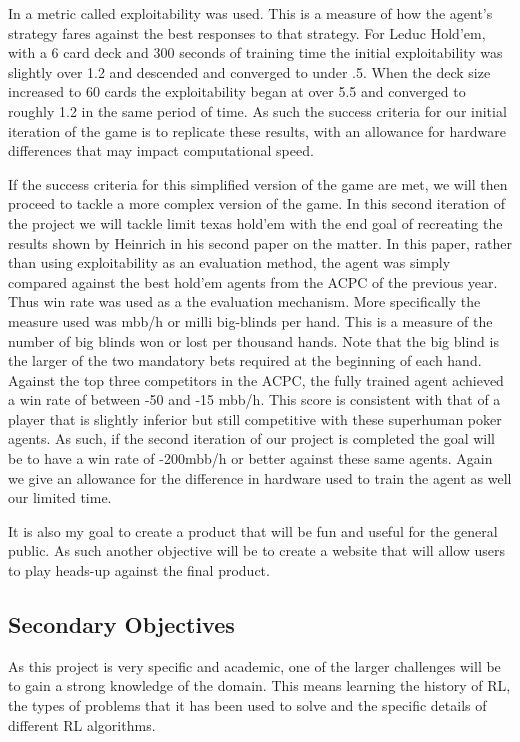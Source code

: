 In\citep{heinrich2015fictitious} a metric called exploitability was used.
This is a measure of how the agent's strategy fares against the best responses to that strategy.
For Leduc Hold'em, with a 6 card deck and 300 seconds of training time the initial exploitability was slightly
over 1.2 and descended and converged to under .5.
When the deck size increased to 60 cards the exploitability began at over 5.5 and converged to roughly 1.2 in
the same period of time.
As such the success criteria for our initial iteration of the game is to replicate these results, with an
allowance for hardware differences that may impact computational speed.

If the success criteria for this simplified version of the game are met, we will then proceed to tackle
a more complex version of the game.
In this second iteration of the project we will tackle limit texas hold'em with the end goal of recreating
the results shown by Heinrich in his second paper on the matter\citep{heinrich2016deep}.
In this paper, rather than using exploitability as an evaluation method, the agent was simply compared
against the best hold'em agents from the ACPC of the previous year.
Thus win rate was used as a the evaluation mechanism.
More specifically the measure used was mbb/h or milli big-blinds per hand.
This is a measure of the number of big blinds won or lost per thousand hands.
Note that the big blind is the larger of the two mandatory bets required at the beginning of each hand.
Against the top three competitors in the ACPC, the fully trained agent achieved a win rate of between
-50 and -15 mbb/h.
This score is consistent with that of a player that is slightly inferior but still competitive with
these superhuman poker agents.
As such, if the second iteration of our project is completed the goal will be to have a win rate of -200mbb/h
or better against these same agents.
Again we give an allowance for the difference in hardware used to train the agent as well our limited time.

It is also my goal to create a product that will be fun and useful for the general public.
As such another objective will be to create a website that will allow users to play heads-up against the final product.

\subsection{Secondary Objectives}\label{subsec:secondaryObjectives}
As this project is very specific and academic, one of the larger challenges will be to gain a strong knowledge
of the domain.
This means learning the history of RL, the types of problems that it has been used to solve and the specific details of
different RL algorithms.

